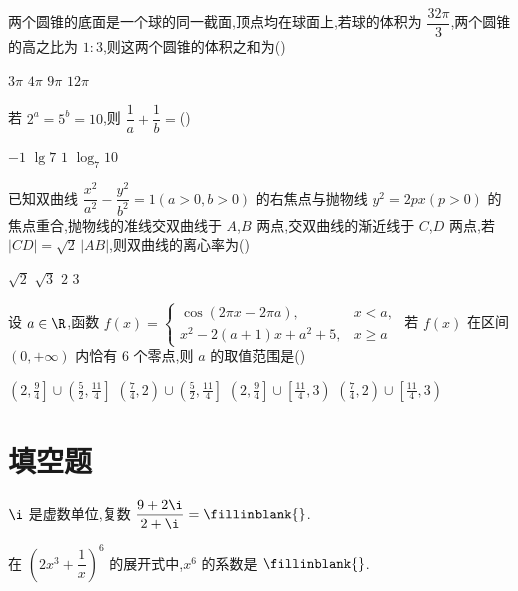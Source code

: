 \begin{problem}
两个圆锥的底面是一个球的同一截面,顶点均在球面上,若球的体积为 \( \dfrac{32\pi}{3} \),两个圆锥的高之比为 \( 1:3 \),则这两个圆锥的体积之和为(\quad)

\choices
    {\(3\pi\)}
    {\(4\pi\)}
    {\(9\pi\)}
    {\(12\pi\)}
\end{problem}

\begin{problem}
若 \( 2^a=5^b=10 \),则 \( \dfrac{1}{a}+\dfrac{1}{b}= \)(\quad)

\choices
    {\(-1\)}
    {\(\lg 7\)}
    {\(1\)}
    {\(\log_{7}10\)}
\end{problem}

\begin{problem}
已知双曲线 \( \dfrac{x^2}{a^2}-\dfrac{y^2}{b^2}=1 \)\( \left( a>0,b>0 \right) \) 的右焦点与抛物线 \( y^2=2px \)\( \left( p>0 \right) \) 的焦点重合,抛物线的准线交双曲线于 \(A\),\(B\) 两点,交双曲线的渐近线于 \(C\),\(D\) 两点,若 \( |CD|=\sqrt2\,|AB| \),则双曲线的离心率为(\quad)

\choices
    {\(\sqrt2\)}
    {\(\sqrt3\)}
    {\(2\)}
    {\(3\)}
\end{problem}

\begin{problem}
设 \( a\in \R \),函数
\( f(x)=\begin{cases}
\cos\left( 2\pi x-2\pi a \right), & x<a,\\
x^2-2(a+1)x+a^2+5, & x\ge a
\end{cases} \)
若 \( f(x) \) 在区间 \( \left( 0,+\infty \right) \) 内恰有 \( 6 \) 个零点,则 \( a \) 的取值范围是(\quad)

\choices
    {\(\left( 2,\frac{9}{4} \right]\cup \left( \frac{5}{2},\frac{11}{4} \right]\)}
    {\(\left( \frac{7}{4},2 \right)\cup \left( \frac{5}{2},\frac{11}{4} \right]\)}
    {\(\left( 2,\frac{9}{4} \right]\cup \left[ \frac{11}{4},3 \right)\)}
    {\(\left( \frac{7}{4},2 \right)\cup \left[ \frac{11}{4},3 \right)\)}
\end{problem}

\section{填空题}

\begin{problem}
\( \i \) 是虚数单位,复数 \( \dfrac{9+2\i}{2+\i}=\fillinblank{} \).
\end{problem}

\begin{problem}
在 \( \left( 2x^3+\dfrac{1}{x} \right)^6 \) 的展开式中,\( x^6 \) 的系数是 \(\fillinblank{}\).
\end{problem}

